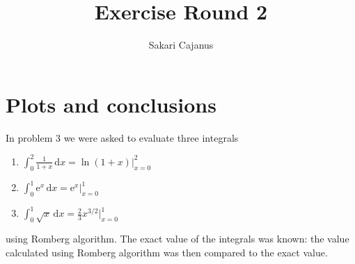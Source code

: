 \documentclass[a4paper,12pt]{scrartcl}
\author{Sakari Cajanus}
\title{Exercise Round 2}{Och samma på English}
\begin{document}
\maketitlepage
\clearpage
{}
\section{Plots and conclusions}
In problem 3 we were asked to evaluate three integrals
\begin{enumerate}[(i.)]
    \item $\displaystyle \int_0^2 \! \frac{1}{1+x} \, \mathrm{d} x = \ln{(1+x)}\bigg\rvert_{x=0}^2$\\
    \item $\displaystyle \int_0^1 \! \mathrm{e}^x \, \mathrm{d} x = \mathrm{e}^x\bigg\rvert_{x=0}^1$\\
    \item $\displaystyle \int_0^1 \! \sqrt{x} \, \mathrm{d} x = \frac{2}{3}x^{3/2}\bigg\rvert_{x=0}^1$
\end{enumerate}
using Romberg algorithm. The exact value of the integrals was known: the
value calculated using Romberg algorithm was then compared to the exact
value.
\end{document}
